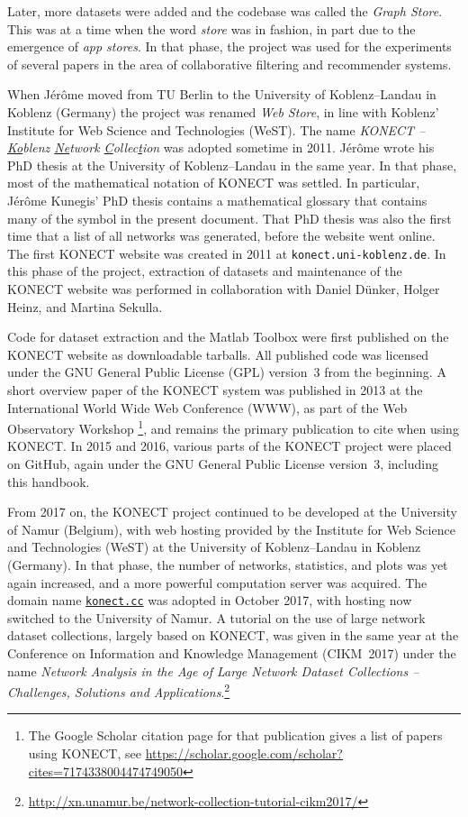 \documentclass{article}
\begin{document}
Later, more datasets
were added and the codebase was called the \emph{Graph Store}.  This was
at a time when the word \emph{store} was in fashion, in part due to the
emergence of \emph{app stores}. 
In that phase, the project was used for the experiments of several papers in the area of
collaborative filtering and recommender systems.  

When Jérôme moved from
TU Berlin to the University of Koblenz--Landau in Koblenz (Germany) the
project was renamed \emph{Web Store}, in line with Koblenz' Institute
for Web Science and Technologies (WeST).  The name \emph{KONECT --
  \underline{Ko}blenz \underline{Ne}twork
  \underline{C}ollec\underline{t}ion} was adopted sometime in 2011.  
Jérôme wrote his PhD thesis at the University of Koblenz--Landau in the
same year. 
In that phase, most of the mathematical notation of KONECT was
settled.  In particular, Jérôme Kunegis' PhD thesis contains a
mathematical glossary that contains many of the symbol in the present
document.  That PhD thesis was also the first time that a list of all
networks was generated, before the website went online. 
The first KONECT website was created in 2011 at \texttt{konect.uni-koblenz.de}.
In this phase of the project, extraction of datasets and maintenance of the
KONECT website was performed in collaboration with Daniel Dünker, Holger
Heinz, and Martina Sekulla. 

Code for dataset extraction and the Matlab Toolbox were first published
on the KONECT website as downloadable tarballs.  All published code was
licensed under the GNU General Public License (GPL) version~3 from the beginning. 
A short overview paper of the KONECT system was
published in 2013 at the International World Wide Web Conference (WWW),
as part of the Web Observatory Workshop \citep{kunegis:konect}\footnote{
  The Google Scholar citation page for that publication gives a list of
  papers using KONECT, see
  \href{https://scholar.google.com/scholar?cites=7174338004474749050}{https://scholar.google.com/scholar?cites=7174338004474749050}},
and remains the primary publication to cite when using KONECT. 
In 2015 and 2016, various parts of the KONECT project were placed on
GitHub, again under the GNU
General Public License version~3, including this handbook.  

From 2017 on, the KONECT project continued to be developed at the University of
Namur (Belgium), with web hosting provided by the Institute for Web
Science and Technologies (WeST) at the University of
Koblenz--Landau in Koblenz (Germany).  In that phase, the number of
networks, statistics, and plots was yet again increased, and a more
powerful computation server was acquired.  The domain name
\href{http://konect.cc/}{\texttt{konect.cc}} was adopted in October
2017, with hosting now switched to the University of Namur. 
A tutorial on the use of large network dataset collections, largely based
on KONECT, was given in the same year at the Conference on Information and Knowledge Management (CIKM~2017) under the name \emph{Network Analysis
  in the Age of Large Network Dataset Collections -- Challenges,
  Solutions and Applications}.\footnote{\href{http://xn.unamur.be/network-collection-tutorial-cikm2017/}{http://xn.unamur.be/network-collection-tutorial-cikm2017/}}
\end{document}
